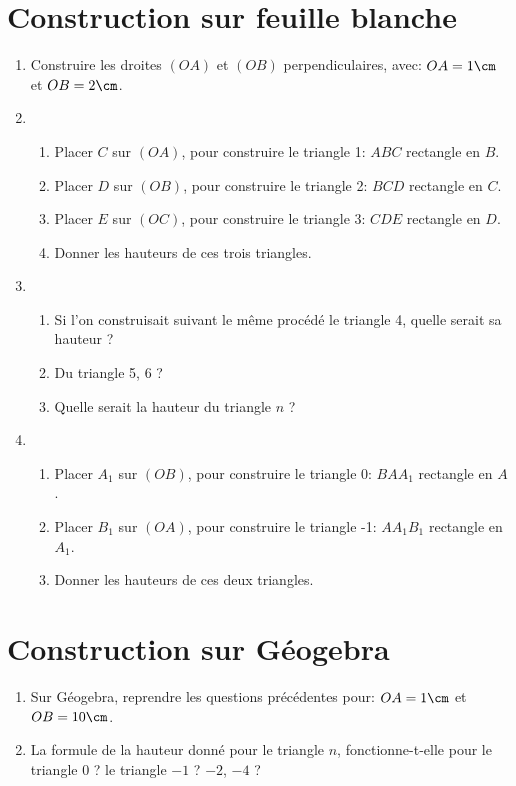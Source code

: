 \def\theme{Activités géométriques : Hauteurs et Triangles}

\newcommand*{\tri}[4]{
    \item Placer $#4$ sur $(O#2)$, pour construire le triangle #1: $#2#3#4$ rectangle en $#3$.
}

\section{Construction sur feuille blanche}

\begin{enumerate}\setlength{\itemsep}{15pt}%
    \item Construire les droites $(OA)$ et $(OB)$ perpendiculaires,
    avec: $OA = 1\cm$ et $OB = 2\cm$.
    \item \begin{enumerate}
        \tri{1}{A}{B}{C}
        \tri{2}{B}{C}{D}
        \tri{3}{C}{D}{E}
        \item Donner les hauteurs de ces trois triangles.
    \end{enumerate}
    \item \begin{enumerate}
        \item Si l'on construisait suivant le même procédé le triangle 4,
        quelle serait sa hauteur ? 
        \item Du triangle 5, 6 ?
        \item Quelle serait la hauteur du triangle $n$ ?
    \end{enumerate}
    \item \begin{enumerate} 
        \tri{0}{B}{A}{A_1}
        \tri{-1}{A}{A_1}{B_1}
        \item Donner les hauteurs de ces deux triangles.
    \end{enumerate}
\end{enumerate}

\section{Construction sur Géogebra}

\begin{enumerate}
    \item Sur Géogebra, reprendre les questions précédentes pour:
    $OA = 1\cm$ et $OB = 10\cm$.\\
    
    \vspace*{0.5cm}
    \item La formule de la hauteur donné pour le triangle $n$, fonctionne-t-elle pour le triangle $0$ ? le triangle $-1$ ? $-2$, $-4$ ?
\end{enumerate}